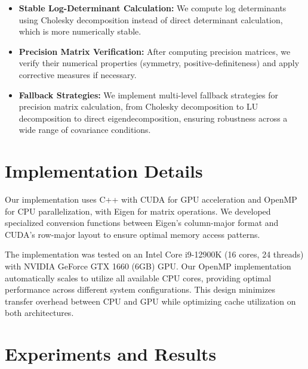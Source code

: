 \documentclass[conference]{IEEEtran}
\begin{document}
\begin{itemize}
    \item \textbf{Stable Log-Determinant Calculation:} We compute log determinants using Cholesky decomposition instead of direct determinant calculation, which is more numerically stable.
    
    \item \textbf{Precision Matrix Verification:} After computing precision matrices, we verify their numerical properties (symmetry, positive-definiteness) and apply corrective measures if necessary.
    
    \item \textbf{Fallback Strategies:} We implement multi-level fallback strategies for precision matrix calculation, from Cholesky decomposition to LU decomposition to direct eigendecomposition, ensuring robustness across a wide range of covariance conditions.
\end{itemize}

\section{Implementation Details}

Our implementation uses C++ with CUDA for GPU acceleration and OpenMP for CPU parallelization, with Eigen for matrix operations. We developed specialized conversion functions between Eigen's column-major format and CUDA's row-major layout to ensure optimal memory access patterns.

The implementation was tested on an Intel Core i9-12900K (16 cores, 24 threads) with NVIDIA GeForce GTX 1660 (6GB) GPU. Our OpenMP implementation automatically scales to utilize all available CPU cores, providing optimal performance across different system configurations. This design minimizes transfer overhead between CPU and GPU while optimizing cache utilization on both architectures.

\section{Experiments and Results}
\label{Experiments and Results}
\end{document}

